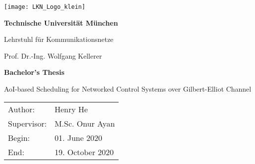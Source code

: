 \thispagestyle{empty}
\newpage

\vspace{5cm}
  \begin{center}
        \texttt{[image: LKN\_Logo\_klein]}
  \end{center}

\begin{center} {\sf\bf 
                               \Large  Technische Universität München
                                \smallskip

                               \Large Lehrstuhl für Kommunikationsnetze
                               \smallskip
                              }

                              {\sf \large Prof. Dr.-Ing. Wolfgang Kellerer} 
\end{center}  

\vspace{4cm}

\begin{center}
        {\bf\Huge Bachelor's Thesis} %
\end{center}

\begin{center}
        \settowidth{\baselineskip}{0.4cm}
        {\LARGE 
        AoI-based Scheduling for Networked Control Systems over Gilbert-Elliot Channel 
        }
\end{center}

\vfill         
{\settowidth{\baselineskip}{0.2cm}
\large\begin{tabular}[l]{ll}
Author: & Henry He\\
Supervisor: & M.Sc. Onur Ayan\\
Begin: & 01. June 2020\\
End: & 19. October 2020
\end{tabular}}
